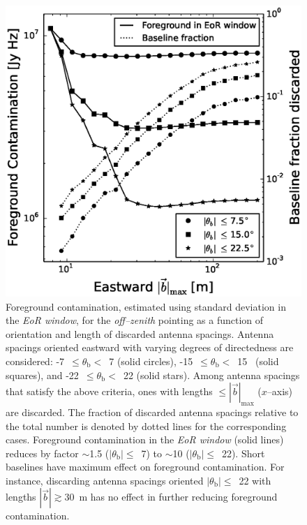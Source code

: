\documentclass[preprint2,iop,numberedappendix]{emulateapj}
\begin{document}
\begin{figure}[htb]
\centering
\includegraphics[width=\linewidth]{figures/v1_0/baseline_screening_nside_64_Tsys_95.0K.eps}
\caption{Foreground contamination, estimated using standard deviation in the {\it EoR window}, for the {\it off--zenith} pointing as a function of orientation and length of discarded antenna spacings. Antenna spacings oriented eastward with varying degrees of directedness are considered: -7~$\le\theta_\textrm{b}<$~7 (solid circles), -15\arcdeg~$\le\theta_\textrm{b}<$~15\arcdeg~ (solid squares), and -22~$\le\theta_\textrm{b}<$~22 (solid stars). Among antenna spacings that satisfy the above criteria, ones with lengths $\le |\vec{b}|_\textrm{max}$ ($x$--axis) are discarded. The fraction of discarded antenna spacings relative to the total number is denoted by dotted lines for the corresponding cases. %
  Foreground contamination in the {\it EoR window} (solid lines) reduces by factor $\sim$1.5 ($|\theta_\textrm{b}|\le$~7) to $\sim$10 ($|\theta_\textrm{b}|\le$~22). Short baselines have maximum effect on foreground contamination. For instance, discarding antenna spacings oriented $|\theta_\textrm{b}|\le$~22 with lengths $|\vec{b}|\gtrsim 30$~m has no effect in further reducing foreground contamination. \label{fig:screening}}
\end{figure}
\end{document}
